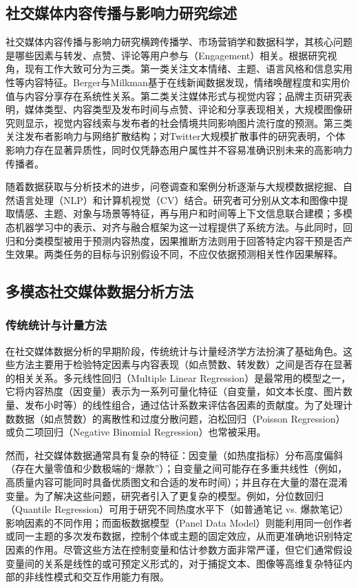 \subsection{社交媒体内容传播与影响力研究综述}
社交媒体内容传播与影响力研究横跨传播学、市场营销学和数据科学，其核心问题是哪些因素与转发、点赞、评论等用户参与（Engagement）相关。根据研究视角，现有工作大致可分为三类。第一类关注文本情绪、主题、语言风格和信息实用性等内容特征。Berger与Milkman基于在线新闻数据发现，情绪唤醒程度和实用价值与内容分享存在系统性关系\cite{BergerMilkman2012}。第二类关注媒体形式与视觉内容；品牌主页研究表明，媒体类型、内容类型及发布时间与点赞、评论和分享表现相关\cite{DeVriesGenslerLeeflang2012,CvijikjMichahelles2013}，大规模图像研究则显示，视觉内容线索与发布者的社会情境共同影响图片流行度的预测\cite{KhoslaEtAl2014}。第三类关注发布者影响力与网络扩散结构；对Twitter大规模扩散事件的研究表明，个体影响力存在显著异质性，同时仅凭静态用户属性并不容易准确识别未来的高影响力传播者\cite{BakshyEtAl2011}。

随着数据获取与分析技术的进步，问卷调查和案例分析逐渐与大规模数据挖掘、自然语言处理（NLP）和计算机视觉（CV）结合。研究者可分别从文本和图像中提取情感、主题、对象与场景等特征，再与用户和时间等上下文信息联合建模；多模态机器学习中的表示、对齐与融合框架为这一过程提供了系统方法\cite{BaltrusaitisAhujaMorency2019}。与此同时，回归和分类模型被用于预测内容热度，因果推断方法则用于回答特定内容干预是否产生效果。两类任务的目标与识别假设不同，不应仅依据预测相关性作因果解释。

\subsection{多模态社交媒体数据分析方法}
\subsubsection{传统统计与计量方法}
在社交媒体数据分析的早期阶段，传统统计与计量经济学方法扮演了基础角色。这些方法主要用于检验特定因素与内容表现（如点赞数、转发数）之间是否存在显著的相关关系。多元线性回归（Multiple Linear Regression）是最常用的模型之一，它将内容热度（因变量）表示为一系列可量化特征（自变量，如文本长度、图片数量、发布小时等）的线性组合，通过估计系数来评估各因素的贡献度。为了处理计数数据（如点赞数）的离散性和过度分散问题，泊松回归（Poisson Regression）或负二项回归（Negative Binomial Regression）也常被采用。

然而，社交媒体数据通常具有复杂的特征：因变量（如热度指标）分布高度偏斜（存在大量零值和少数极端的“爆款”）；自变量之间可能存在多重共线性（例如，高质量内容可能同时具备优质图文和合适的发布时间）；并且存在大量的潜在混淆变量。为了解决这些问题，研究者引入了更复杂的模型。例如，分位数回归（Quantile Regression）可用于研究不同热度水平下（如普通笔记 vs. 爆款笔记）影响因素的不同作用；而面板数据模型（Panel Data Model）则能利用同一创作者或同一主题的多次发布数据，控制个体或主题的固定效应，从而更准确地识别特定因素的作用。尽管这些方法在控制变量和估计参数方面非常严谨，但它们通常假设变量间的关系是线性的或可预定义形式的，对于捕捉文本、图像等高维复杂特征内部的非线性模式和交互作用能力有限。
